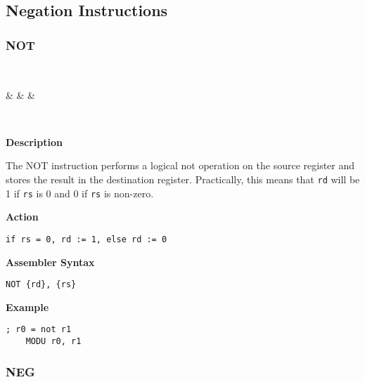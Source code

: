 \subsection{Negation Instructions}

\subsubsection{NOT }\label{sec:NOT}

\vspace{3ex}

\begin{center}
	\begin{bytefield}[leftcurly=., leftcurlyspace=0pt]{32}
		 \\
		\begin{leftwordgroup}{}
		 & 
		 &
		 &
		\end{leftwordgroup}\\
	\end{bytefield}
\end{center}

\textbf{Description}

The NOT instruction performs a logical not operation on the source register and stores the result in the destination register.
Practically, this means that \texttt{rd} will be 1 if \texttt{rs} is 0 and 0 if \texttt{rs} is non-zero.

\vspace{3ex}

\textbf{Action}
\begin{lstlisting}[frame=single]
	if rs = 0, rd := 1, else rd := 0
\end{lstlisting}

\vspace{3ex}

\textbf{Assembler Syntax}
\begin{lstlisting}[frame=single]
	NOT {rd}, {rs}
\end{lstlisting}

\vspace{3ex}

\textbf{Example}
\begin{lstlisting}[frame=single]
	; r0 = not r1
	MODU r0, r1
\end{lstlisting}

\subsubsection{NEG }\label{sec:NEG}
 
